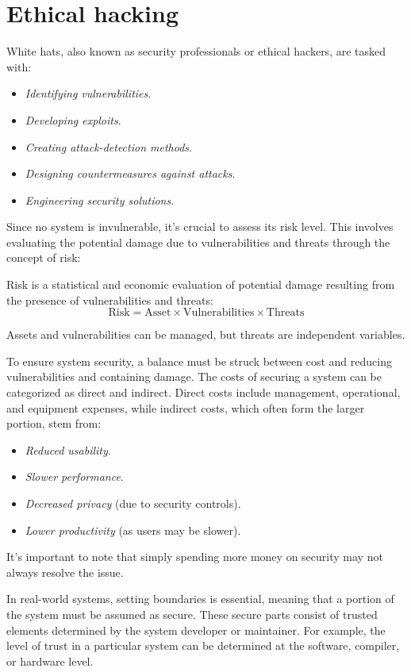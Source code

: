 \section{Ethical hacking}

White hats, also known as security professionals or ethical hackers, are tasked with:
\begin{itemize}
    \item \textit{Identifying vulnerabilities}.
    \item \textit{Developing exploits}.
    \item \textit{Creating attack-detection methods}.
    \item \textit{Designing countermeasures against attacks}.
    \item \textit{Engineering security solutions}.
\end{itemize}

Since no system is invulnerable, it's crucial to assess its risk level.
This involves evaluating the potential damage due to vulnerabilities and threats through the concept of risk:
\begin{definition}
    Risk is a statistical and economic evaluation of potential damage resulting from the presence of vulnerabilities and threats:
    \[\text{Risk}=\text{Asset} \times \text{Vulnerabilities} \times \text{Threats}\]
\end{definition}
Assets and vulnerabilities can be managed, but threats are independent variables.

To ensure system security, a balance must be struck between cost and reducing vulnerabilities and containing damage.
The costs of securing a system can be categorized as direct and indirect.
Direct costs include management, operational, and equipment expenses, while indirect costs, which often form the larger portion, stem from:
\begin{itemize}
    \item \textit{Reduced usability}. 
    \item \textit{Slower performance}. 
    \item \textit{Decreased privacy} (due to security controls). 
    \item \textit{Lower productivity} (as users may be slower). 
\end{itemize}
It's important to note that simply spending more money on security may not always resolve the issue.

In real-world systems, setting boundaries is essential, meaning that a portion of the system must be assumed as secure. 
These secure parts consist of trusted elements determined by the system developer or maintainer. 
For example, the level of trust in a particular system can be determined at the software, compiler, or hardware level.
